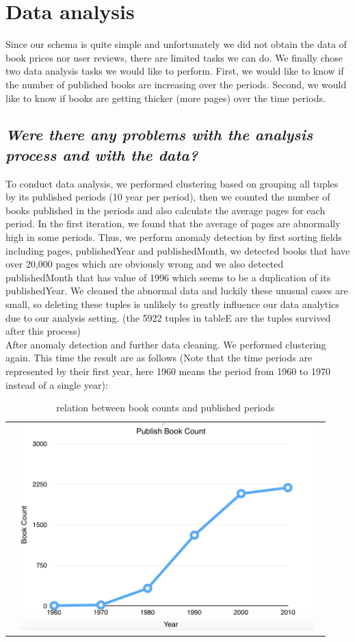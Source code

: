 \documentclass[10pt, oneside]{article}
\begin{document}
\section*{Data analysis}
Since our schema is quite simple and unfortunately we did not obtain the data of book prices nor user reviews, there are limited tasks we can do. We finally chose two data analysis tasks we would like to perform. First, we would like to know if the number of published books are increasing over the periods. Second, we would like to know if books are getting thicker (more pages) over the time periods.
\subsection*{\textit{Were there any problems with the analysis process and with the data?}}
To conduct data analysis, we performed clustering based on grouping all tuples by its published periods (10 year per period), then we counted the number of books published in the periods and also calculate the average pages for each period. In the first iteration, we found that the average of pages are abnormally high in some periods. Thus, we perform anomaly detection by first sorting fields including pages, publishedYear and publishedMonth, we detected books that have over 20,000 pages which are obviously wrong and we also detected publishedMonth that has value of 1996 which seems to be a duplication of its publishedYear. We cleaned the abnormal data and luckily these unusual cases are small, so deleting these tuples is unlikely to greatly influence our data analytics due to our analysis setting. (the 5922 tuples in tableE are the tuples survived after this process)\\
After anomaly detection and further data cleaning. We performed clustering again. This time the result are as follows (Note that the time periods are represented by their first year, here 1960 means the period from 1960 to 1970 instead of a single year):

\begin{table}[H]
\centering
\begin{tabular}{c}
\includegraphics[width=12cm, height=8cm]{bookcount}
\end{tabular}
\caption{relation between book counts and published periods}
\end{table}
\end{document}
